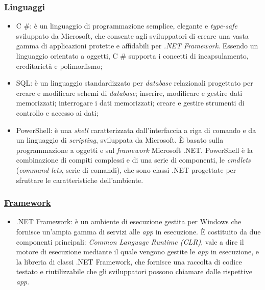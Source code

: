 \subsubsection{\underline{Linguaggi}}
\begin{itemize}
    \item C \#: è un linguaggio di programmazione semplice, elegante e \emph{type-safe} sviluppato da Microsoft, che consente agli sviluppatori di creare una vasta gamma di applicazioni protette e affidabili per \emph{.NET Framework}. Essendo un linguaggio orientato a oggetti, C \# supporta i concetti di incapsulamento, ereditarietà e polimorfismo;\cite{microsoft-csharp}
    \item SQL: è un linguaggio standardizzato per \emph{database} relazionali progettato per creare e modificare schemi di \emph{database}; inserire, modificare e gestire dati memorizzati; interrogare i dati memorizzati; creare e gestire strumenti di controllo e accesso ai dati;\cite{db-sql}
    \item PowerShell: è una \emph{shell} caratterizzata dall'interfaccia a riga di comando e da un linguaggio di \emph{scripting}, sviluppata da Microsoft. È basato sulla programmazione a oggetti e sul \emph{framework} Microsoft .NET. PowerShell è la combinazione di compiti complessi e di una serie di componenti, le \emph{cmdlets}  (\emph{command lets}, serie di comandi), che sono classi .NET progettate per sfruttare le caratteristiche dell'ambiente. \cite{microsoft-ps}
\end{itemize}
\subsubsection{\underline{Framework}}
\begin{itemize}
    \item .NET Framework: è un ambiente di esecuzione gestita per Windows che fornisce un'ampia gamma di servizi alle \emph{app} in esecuzione. È costituito da due componenti principali: \emph{Common Language Runtime (CLR)}, vale a dire il motore di esecuzione mediante il quale vengono gestite le \emph{app} in esecuzione, e la libreria di classi .NET Framework, che fornisce una raccolta di codice testato e riutilizzabile che gli sviluppatori possono chiamare dalle rispettive \emph{app}.\cite{microsoft-net}
\end{itemize}

